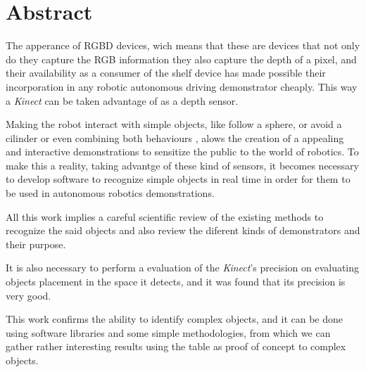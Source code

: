\chapter*{Abstract}


The apperance of RGBD devices, wich means that these are devices that not only do they capture the RGB information they also capture the depth of a pixel, and their availability as a consumer of the shelf device has made possible their incorporation in any robotic autonomous driving demonstrator cheaply. This way a \emph{Kinect} can be taken advantage of as a depth sensor.

Making the robot interact with simple objects, like follow a sphere, or avoid a cilinder or even combining both behaviours , alows the creation of a appealing and interactive demonstrations to sensitize the public to the world of robotics. To make this a reality, taking advantge of these kind of sensors, it becomes necessary to develop software to recognize simple objects in real time in order for them to be used in autonomous robotics demonstrations.

All this work implies a careful scientific review of the existing methods to recognize the said objects and also review the diferent kinds of demonstrators and their purpose. 

It is also necessary to perform a evaluation of the \emph{Kinect}'s precision on evaluating objects placement in the space it detects, and it was found that its precision is very good.

This work confirms the ability to identify complex objects, and it can be done using software libraries and some simple methodologies, from which we can gather rather interesting results using the table as proof of concept to complex objects.

